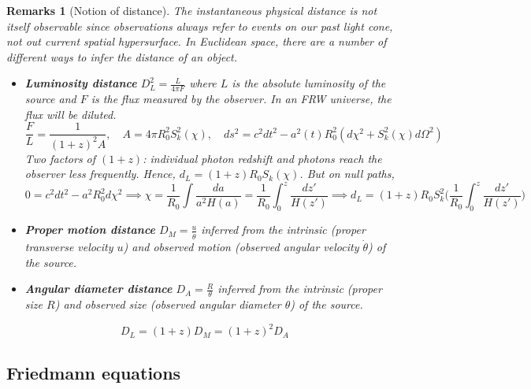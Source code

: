 \documentclass[a4paper]{article}
\newtheorem{remarks}{Remarks}[section]
\theoremstyle{new}
\begin{document}
\begin{remarks}[Notion of distance]
The instantaneous physical distance is not itself observable since observations always refer to events on our past light cone, not out current spatial hypersurface. In Euclidean space, there are a number of different ways to infer the distance of an object.
\begin{itemize}
    \item \textbf{Luminosity distance} $D_L^2=\frac{L}{4\pi F}$ where $L$ is the absolute luminosity of the source and $F$ is the flux measured by the observer. In an FRW universe, the flux will be diluted.
    $$\frac{F}{L}=\frac{1}{(1+z)^2A},\quad A=4\pi R_0^2S_k^2(\chi),\quad ds^2=c^2dt^2-a^2(t)R_0^2(d\chi^2+S_k^2(\chi)d\Omega^2)$$
    Two factors of $(1+z)$: individual photon redshift and photons reach the observer less frequently. Hence, $d_L=(1+z)R_0S_k(\chi)$. But on null paths,
    $$0=c^2dt^2-a^2R_0^2d\chi^2\implies\chi=\frac{1}{R_0}\int\frac{da}{a^2H(a)}=\frac{1}{R_0}\int_0^z\frac{dz'}{H(z')}\implies d_L=(1+z)R_0S_k^2\bigg(\frac{1}{R_0}\int_0^z\frac{dz'}{H(z')}\bigg)$$
    \item \textbf{Proper motion distance} $D_M=\frac{u}{\dot{\theta}}$ inferred from the intrinsic (proper transverse velocity $u$) and observed motion (observed angular velocity $\dot{\theta}$) of the source.
    \item \textbf{Angular diameter distance} $D_A=\frac{R}{\theta}$ inferred from the intrinsic (proper size $R$) and observed size (observed angular diameter $\theta$) of the source.
\end{itemize}
$$D_L=(1+z)D_M=(1+z)^2D_A$$
\end{remarks}
\subsection{Friedmann equations}
\end{document}
